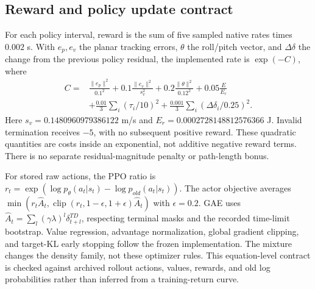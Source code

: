 \subsection{Reward and policy update contract}
For each policy interval, reward is the sum of five sampled native rates times $0.002$ s. With $e_p,e_v$ the planar tracking errors, $\theta$ the roll/pitch vector, and $\Delta\delta$ the change from the previous policy residual, the implemented rate is $\exp(-C)$, where
\begin{align}
 C={}&\frac{\|e_p\|^2}{0.1^2}+0.1\frac{\|e_v\|^2}{s_v^2}
 +0.2\frac{\|\theta\|^2}{0.12^2}+0.05\frac{E}{E_r}\nonumber\\
 &+\frac{0.01}{3}\sum_i(\tau_i/10)^2
 +\frac{0.001}{3}\sum_i(\Delta\delta_i/0.25)^2.
\end{align}
Here $s_v=0.1480960979386122$ m/s and $E_r=0.0002728148812576366$ J. Invalid termination receives $-5$, with no subsequent positive reward. These quadratic quantities are costs inside an exponential, not additive negative reward terms. There is no separate residual-magnitude penalty or path-length bonus.

For stored raw actions, the PPO ratio is $r_t=\exp(\log p_\theta(a_t|s_t)-\log p_{old}(a_t|s_t))$. The actor objective averages $\min(r_t\hat A_t,\operatorname{clip}(r_t,1-\epsilon,1+\epsilon)\hat A_t)$ with $\epsilon=0.2$. GAE uses $\hat A_t=\sum_l(\gamma\lambda)^l\delta_{t+l}^{TD}$, respecting terminal masks and the recorded time-limit bootstrap. Value regression, advantage normalization, global gradient clipping, and target-KL early stopping follow the frozen implementation. The mixture changes the density family, not these optimizer rules. This equation-level contract is checked against archived rollout actions, values, rewards, and old log probabilities rather than inferred from a training-return curve.
